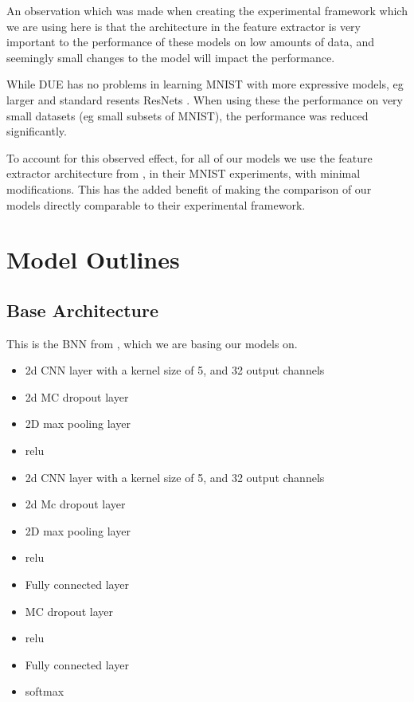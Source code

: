 \documentclass[12pt, a4paper]{report}
\theoremstyle{definition}
\theoremstyle{definition}
\theoremstyle{definition}
\begin{document}
An observation which was made when creating the experimental framework which we are using here is that the architecture in the feature extractor is very important to the performance of these models on low amounts of data, and seemingly small changes to the model will impact the performance.

While DUE has no problems in learning MNIST with more expressive models, eg larger and standard resents ResNets \cite{resnet9}. When using these the performance on very small datasets (eg small subsets of MNIST), the performance was reduced significantly.


To account for this observed effect, for all of our models we use the feature extractor architecture from \cite{kirsch2019batchbald}, in their MNIST experiments, with minimal modifications. This has the added benefit of making the comparison of our models directly comparable to their experimental framework.


\section{Model Outlines}


\subsection{Base Architecture}

This is the BNN from \cite{kirsch2019batchbald}, which we are basing our models on.


\begin{itemize}
    \item 2d CNN layer with a kernel size of 5, and 32 output channels
    \item 2d MC dropout layer
    \item 2D max pooling layer
    \item relu
    \item 2d CNN layer with a kernel size of 5, and 32 output channels
    \item 2d Mc dropout layer
    \item 2D max pooling layer
    \item relu
    \item Fully connected layer
    \item MC dropout layer
    \item relu
    \item Fully connected layer
    \item softmax
\end{itemize}
\end{document}
